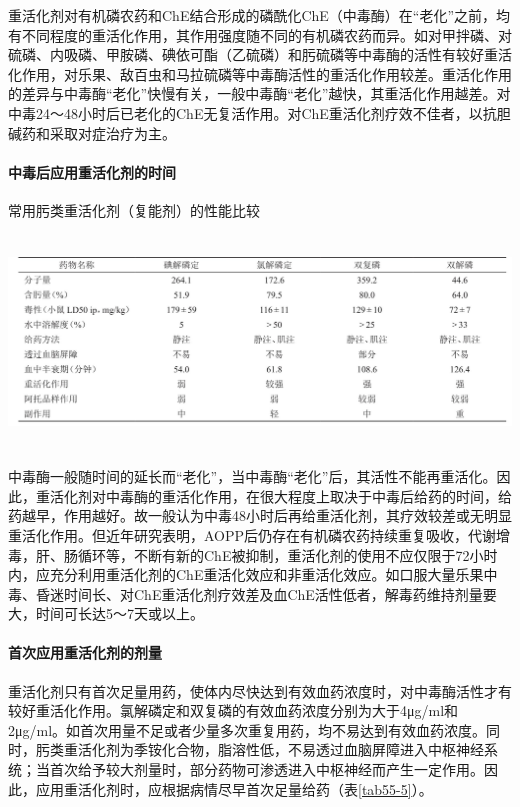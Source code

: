 重活化剂对有机磷农药和ChE结合形成的磷酰化ChE（中毒酶）在“老化”之前，均有不同程度的重活化作用，其作用强度随不同的有机磷农药而异。如对甲拌磷、对硫磷、内吸磷、甲胺磷、碘依可酯（乙硫磷）和肟硫磷等中毒酶的活性有较好重活化作用，对乐果、敌百虫和马拉硫磷等中毒酶活性的重活化作用较差。重活化作用的差异与中毒酶“老化”快慢有关，一般中毒酶“老化”越快，其重活化作用越差。对中毒24～48小时后已老化的ChE无复活作用。对ChE重活化剂疗效不佳者，以抗胆碱药和采取对症治疗为主。

\paragraph{中毒后应用重活化剂的时间}

\begin{table}[htbp]
\centering
\caption{常用肟类重活化剂（复能剂）的性能比较}
\label{tab55-4}
\includegraphics[width=6.66667in,height=2.22917in]{./images/Image00206.jpg}
\end{table}

中毒酶一般随时间的延长而“老化”，当中毒酶“老化”后，其活性不能再重活化。因此，重活化剂对中毒酶的重活化作用，在很大程度上取决于中毒后给药的时间，给药越早，作用越好。故一般认为中毒48小时后再给重活化剂，其疗效较差或无明显重活化作用。但近年研究表明，AOPP后仍存在有机磷农药持续重复吸收，代谢增毒，肝、肠循环等，不断有新的ChE被抑制，重活化剂的使用不应仅限于72小时内，应充分利用重活化剂的ChE重活化效应和非重活化效应。如口服大量乐果中毒、昏迷时间长、对ChE重活化剂疗效差及血ChE活性低者，解毒药维持剂量要大，时间可长达5～7天或以上。

\paragraph{首次应用重活化剂的剂量}

重活化剂只有首次足量用药，使体内尽快达到有效血药浓度时，对中毒酶活性才有较好重活化作用。氯解磷定和双复磷的有效血药浓度分别为大于4μg/ml和2μg/ml。如首次用量不足或者少量多次重复用药，均不易达到有效血药浓度。同时，肟类重活化剂为季铵化合物，脂溶性低，不易透过血脑屏障进入中枢神经系统；当首次给予较大剂量时，部分药物可渗透进入中枢神经而产生一定作用。因此，应用重活化剂时，应根据病情尽早首次足量给药（表\ref{tab55-5}）。

